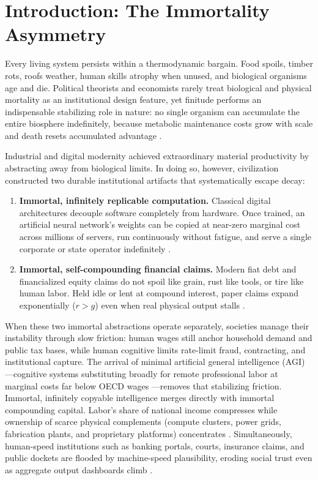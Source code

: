 \documentclass[11pt]{article}
\begin{document}
\section{Introduction: The Immortality Asymmetry}\label{sec:intro}

Every living system persists within a thermodynamic bargain. Food spoils, timber rots, roofs weather, human skills atrophy when unused, and biological organisms age and die. Political theorists and economists rarely treat biological and physical mortality as an institutional design feature, yet finitude performs an indispensable stabilizing role in nature: no single organism can accumulate the entire biosphere indefinitely, because metabolic maintenance costs grow with scale and death resets accumulated advantage \citep{arendt1958human, jonas1984responsibility}.

Industrial and digital modernity achieved extraordinary material productivity by abstracting away from biological limits. In doing so, however, civilization constructed two durable institutional artifacts that systematically escape decay:
\begin{enumerate}
  \item \textbf{Immortal, infinitely replicable computation.} Classical digital architectures decouple software completely from hardware. Once trained, an artificial neural network's weights can be copied at near-zero marginal cost across millions of servers, run continuously without fatigue, and serve a single corporate or state operator indefinitely \citep{hinton2022forward}.
  \item \textbf{Immortal, self-compounding financial claims.} Modern fiat debt and financialized equity claims do not spoil like grain, rust like tools, or tire like human labor. Held idle or lent at compound interest, paper claims expand exponentially ($r > g$) even when real physical output stalls \citep{gesell1916natural, keynes1936general, piketty2014capital}.
\end{enumerate}

When these two immortal abstractions operate separately, societies manage their instability through slow friction: human wages still anchor household demand and public tax bases, while human cognitive limits rate-limit fraud, contracting, and institutional capture. The arrival of minimal artificial general intelligence (AGI)---cognitive systems substituting broadly for remote professional labor at marginal costs far below OECD wages \citep{acemoglu2025simple, korinek2024scenarios}---removes that stabilizing friction. Immortal, infinitely copyable intelligence merges directly with immortal compounding capital. Labor's share of national income compresses while ownership of scarce physical complements (compute clusters, power grids, fabrication plants, and proprietary platforms) concentrates \citep{nordhaus2021singularity}. Simultaneously, human-speed institutions such as banking portals, courts, insurance claims, and public dockets are flooded by machine-speed plausibility, eroding social trust even as aggregate output dashboards climb \citep{christiano2019failure}.
\end{document}
